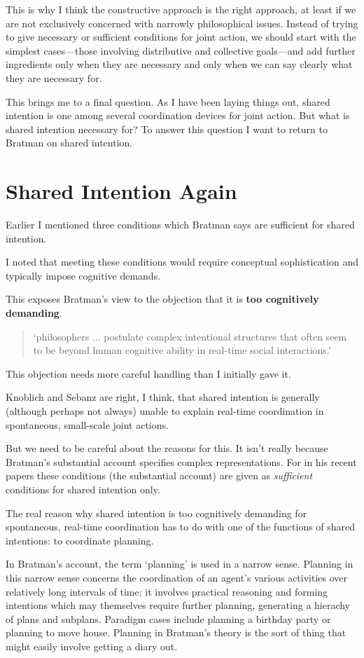 \documentclass[14pt,a4paper]{extarticle}
\begin{document}
This is why I think the constructive approach is the right approach, at least if we are not exclusively concerned with narrowly philosophical issues.
Instead of trying to give necessary or sufficient conditions for joint action, we should start with the simplest cases---those involving distributive and collective goals---and add further ingredients only when they are necessary and only when we can say clearly what they are necessary for.

This brings me to a final question.
As I have been laying things out, shared intention is one among several coordination devices for joint action.
But what is shared intention necessary for?
To answer this question I want to return to Bratman on shared intention.


\section{Shared Intention Again}
Earlier I mentioned three conditions which Bratman says are sufficient for shared intention.

I noted that meeting these conditions would require conceptual sophistication and typically impose cognitive demands.

This exposes Bratman's view to the objection that it is \textbf{too cognitively demanding}.  
%
\begin{quote}
`philosophers ... postulate complex intentional structures that often seem to be beyond human cognitive ability in real-time social interactions.'
\citep[p.\ 2022]{Knoblich:2008hy}
\end{quote}
%
This objection needs more careful handling than I initially gave it.  

Knoblich and Sebanz are right, I think, that shared intention is generally (although perhaps not always) unable to explain real-time coordination in spontaneous, small-scale joint actions.

But we need to be careful about the reasons for this.  It isn't really because Bratman's substantial account specifies complex representations.  For in his recent papers these conditions (the substantial account) are given as \emph{sufficient}  conditions for shared intention only.

The real reason why shared intention is too cognitively demanding for spontaneous, real-time coordination has to do with one of the functions of shared intentions: to coordinate planning.  

In Bratman’s account, the term `planning' is used in a narrow sense.  Planning in this narrow sense concerns the coordination of an agent’s various activities over relatively long intervals of time; it involves practical reasoning and forming intentions which may themselves require further planning, generating a hierachy of plans and subplans.  Paradigm cases include planning a birthday party or planning to move house.   Planning in Bratman's theory is the sort of thing that might easily involve getting a diary out.
\end{document}
